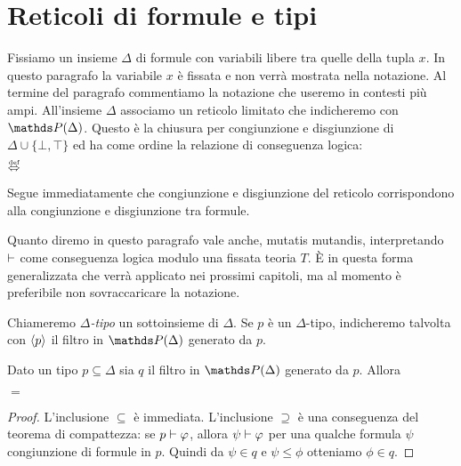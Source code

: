 \section{Reticoli di formule e tipi}\label{frammenti}

\def\ceq#1#2#3{\hspace*{25ex}\llap{#1}\parbox{6ex}{\hfil#2}\rlap{#3}}

Fissiamo un insieme \emph{$\Delta$\/} di formule con variabili libere tra quelle della tupla \emph{$x$}. In questo paragrafo la variabile $x$ \`e fissata e non verr\`a mostrata nella notazione. Al termine del paragrafo commentiamo la notazione che useremo in contesti pi\`u ampi. All'insieme $\Delta$ associamo un reticolo limitato che indicheremo con \emph{$\PP(\Delta)$}. Questo \`e la chiusura per congiunzione e disgiunzione di $\Delta\cup\{\bot,\top\}$ ed ha come ordine la relazione di conseguenza logica:

\ceq{$\psi\le\phi$}{$\dIFF$}{$\psi\ \proves\ \phi$} 

Segue immediatamente che congiunzione e disgiunzione del reticolo corrispondono alla congiunzione e disgiunzione tra formule.

Quanto diremo in questo paragrafo vale anche, mutatis mutandis, interpretando $\vdash$ come conseguenza logica modulo una fissata teoria $T$. \`E in questa forma generalizzata che verr\`a applicato nei prossimi capitoli, ma al momento \`e preferibile non sovraccaricare la notazione. 

Chiameremo \emph{$\Delta$-tipo\/} un sottoinsieme di $\Delta$. Se $p$ \`e un $\Delta$-tipo, indicheremo talvolta con $\langle p\rangle$ il filtro in $\PP(\Delta)$ generato da $p$.

\begin{lemma}\label{poiuyhdsdfd}
Dato un tipo $p\subseteq\Delta$ sia $q$ il filtro in $\PP(\Delta)$ generato da $p$. Allora

\ceq{$q$}{$=$}{\Big\{$\ \phi\;\in\;\PP(\Delta)\ \ \ :\ \ \ p\ \proves\ \phi\ \Big\}$}

\end{lemma}
\begin{proof}
L'inclusione $\subseteq$ \`e immediata. L'inclusione $\supseteq$ \`e una conseguenza del teorema di compattezza: se $p\vdash\varphi$, allora $\psi\vdash\varphi$ per una qualche formula $\psi$ congiunzione di formule in $p$. Quindi da $\psi\in q$ e $\psi\le\phi$ otteniamo $\phi\in q$.
\end{proof}


